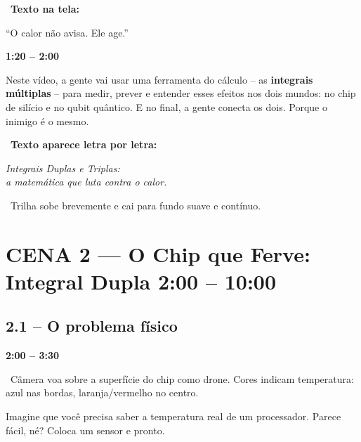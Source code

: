\documentclass[12pt, a4paper]{article}
\newcommand{\tempo}[1]{%
  \noindent\hfill
  {\small\sffamily\color{corTempo}%
   \faStopwatch\enspace\textbf{#1}}%
  \par\vspace{2pt}%
}
\begin{document}
\begin{tela}
\faDesktop\ \textbf{Texto na tela:}
\begin{center}
``O calor não avisa. Ele age.''
\end{center}
\end{tela}

\tempo{1:20 -- 2:00}

\begin{fala}
Neste vídeo, a gente vai usar uma ferramenta do cálculo -- as
\textbf{integrais múltiplas} -- para medir, prever e entender esses efeitos
nos dois mundos: no chip de silício e no qubit quântico.
E no final, a gente conecta os dois. Porque o inimigo é o mesmo.
\end{fala}

\begin{tela}
\faDesktop\ \textbf{Texto aparece letra por letra:}
\begin{center}
\large\itshape Integrais Duplas e Triplas:\\
a matemática que luta contra o calor.
\end{center}
\end{tela}

\begin{audiocue}
\faMusic\ Trilha sobe brevemente e cai para fundo suave e contínuo.
\end{audiocue}

\section{CENA 2 --- O Chip que Ferve: Integral Dupla \hfill \normalfont\small\color{corTempo}2:00 -- 10:00}

\subsection{2.1 -- O problema físico}
\tempo{2:00 -- 3:30}

\begin{visual}
\faFilm\ Câmera voa sobre a superfície do chip como drone. Cores indicam temperatura:
azul nas bordas, laranja/vermelho no centro.
\end{visual}

\begin{fala}
Imagine que você precisa saber a temperatura real de um processador.
Parece fácil, né? Coloca um sensor e pronto.
\end{fala}
\end{document}
